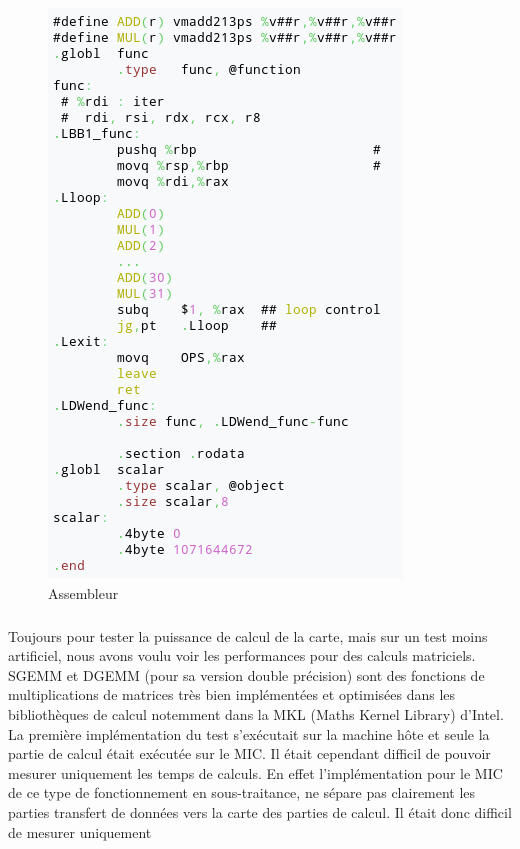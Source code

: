 \documentclass{article}
\begin{document}
					\begin{figure}
					\begin{center}
					\includegraphics[scale=0.40]{assembleur.png}
					\caption{Assembleur}
					\end{center}
					\end{figure}
					\subparagraph{}
					Toujours pour tester la puissance de calcul de la carte, mais sur un test moins artificiel, nous avons voulu
					voir les performances pour des calculs matriciels. SGEMM et DGEMM (pour sa version double précision) sont 
					des fonctions de multiplications de matrices très bien implémentées et optimisées dans les bibliothèques de 
					calcul notemment dans la MKL (Maths Kernel Library) d'Intel. \newline
					La première implémentation du test s'exécutait sur la machine hôte et seule la partie de calcul était 
					exécutée sur le MIC. Il était cependant difficil de pouvoir mesurer uniquement les temps de calculs. En effet
					l'implémentation pour le MIC de ce type de fonctionnement en sous-traitance, ne sépare pas clairement les 
					parties transfert de données vers la carte des parties de calcul. Il était donc difficil de mesurer uniquement 
\end{document}
